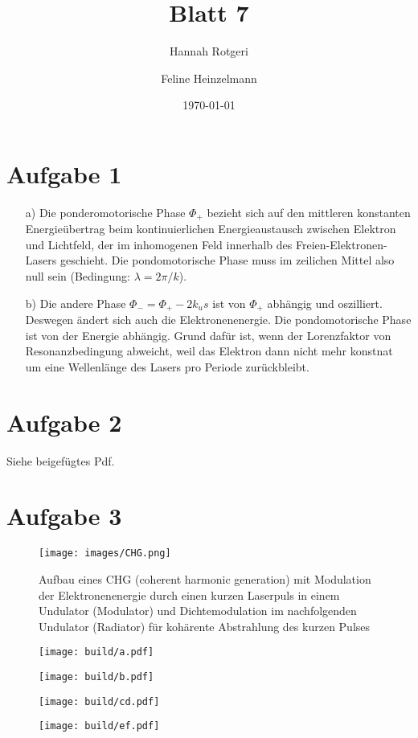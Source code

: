 \documentclass[11pt,a4paper]{article}
\title{Blatt 7}
\date{\today}
\author{Hannah Rotgeri \and Feline Heinzelmann}
\begin{document}
    \maketitle

    \section*{Aufgabe 1}
	\begin{itemize}
		\item[a)]
			Die ponderomotorische Phase $\Phi_{+}$ bezieht sich auf den mittleren konstanten Energieübertrag beim kontinuierlichen Energieaustausch zwischen Elektron und Lichtfeld, 
            der im inhomogenen Feld innerhalb des Freien-Elektronen-Lasers geschieht. 
            Die pondomotorische Phase muss im zeilichen Mittel also null sein (Bedingung: $\lambda = 2 \pi /k$). 
		\item[b)]
			Die andere Phase $\Phi_{-} = \Phi_{+} - 2k_{u}s$ ist von $\Phi_{+}$ abhängig und oszilliert. Deswegen ändert sich auch die Elektronenenergie.
            Die pondomotorische Phase ist von der Energie abhängig. Grund dafür ist, wenn der Lorenzfaktor von Resonanzbedingung abweicht, weil das Elektron dann nicht mehr konstnat um eine Wellenlänge des Lasers pro Periode zurückbleibt.
	\end{itemize}


	
    \section*{Aufgabe 2}
		Siehe beigefügtes Pdf.

	\section*{Aufgabe 3}

        \begin{figure}
			\centering
			\texttt{[image: images/CHG.png]}
            \caption{Aufbau eines CHG (coherent harmonic generation) mit Modulation der Elektronenenergie durch einen kurzen Laserpuls in einem Undulator 
            (Modulator) und Dichtemodulation im nachfolgenden Undulator (Radiator) für kohärente Abstrahlung des kurzen Pulses}
		\end{figure}


		\begin{figure}
			\centering
			\texttt{[image: build/a.pdf]}
		\end{figure}

		\begin{figure}
			\centering
			\texttt{[image: build/b.pdf]}
		\end{figure}

		\begin{figure}
			\centering
			\texttt{[image: build/cd.pdf]}
		\end{figure}

		\begin{figure}
			\centering
			\texttt{[image: build/ef.pdf]}
		\end{figure}
\end{document}
